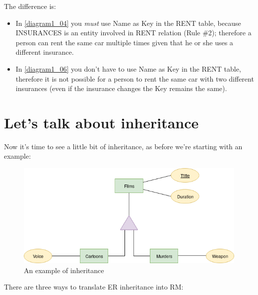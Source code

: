 \documentclass[class=book, crop=false, oneside]{standalone}
\begin{document}
The difference is:
\begin{itemize}
	\item In \ref{diagram1_04} you \emph{must} use Name as Key in the RENT table, because INSURANCES is an entity involved in RENT relation (Rule \#2); therefore a person can rent the same car multiple times given that he or she uses a different insurance.\\
	\item In \ref{diagram1_06} you don't have to use Name as Key in the RENT table, therefore it is not possible for a person to rent the same car with two different insurances (even if the insurance changes the Key remains the same).
\end{itemize}
\newpage

\section{Let's talk about inheritance}
Now it's time to see a little bit of inheritance, as before we're starting with an example:
\begin{figure}[H]
	\includegraphics[width=\textwidth,keepaspectratio]{diagram2_00.png}
	\caption{An example of inheritance}
	\label{diagram2_00}
\end{figure}
There are three ways to translate ER inheritance into RM:
\end{document}
